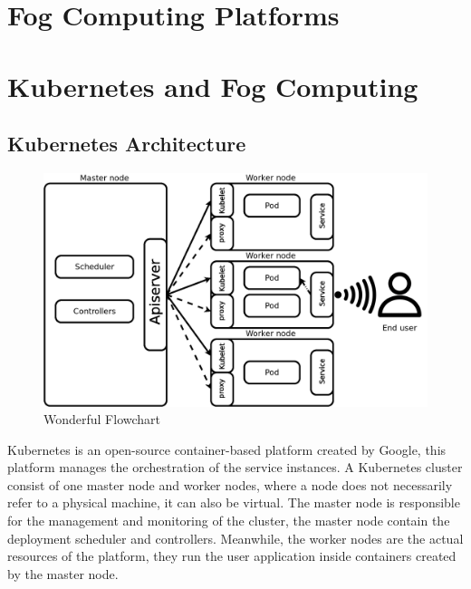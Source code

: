 \documentclass[letterpaper,twocolumn,10pt]{article}
\begin{document}
\section{Fog Computing Platforms}\label{plat}
\lipsum[20]
\section{Kubernetes and Fog Computing}\label{kube}

\subsection{Kubernetes Architecture}

\begin{figure}[th]
\begin{center}
\includegraphics[width=\textwidth/2]{images/arch.png}
\end{center}
\caption{Wonderful Flowchart}
\end{figure}

Kubernetes is an open-source container-based platform created by Google, this platform manages the orchestration of the service instances. A Kubernetes cluster consist of one master node and worker nodes, where a node does not necessarily refer to a physical machine, it can also be virtual. The master node is responsible for the management and monitoring of the cluster, the master node contain the deployment scheduler and controllers.  Meanwhile, the worker nodes are the actual resources of the platform, they run the user application inside containers created by the master node. 
\end{document}
